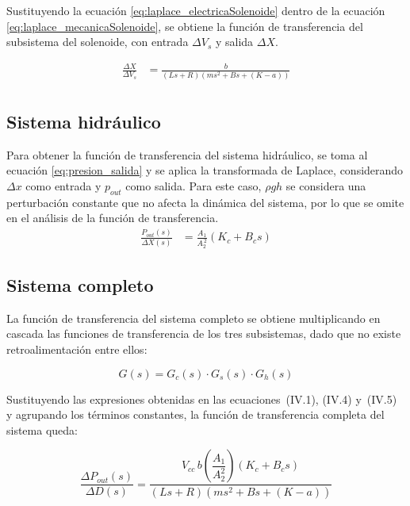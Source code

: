 \documentclass[journal]{IEEEtran}
\begin{document}
Sustituyendo la ecuación \ref{eq:laplace_electricaSolenoide} dentro de la ecuación \ref{eq:laplace_mecanicaSolenoide}, 
se obtiene la función de transferencia del subsistema del solenoide, con entrada $\Delta V_s$ y salida $\Delta X$.

\begin{equation}
\begin{aligned}
    \frac{\Delta X}{\Delta V_s} &= \frac{b}{(Ls + R)(m s^2 + B s + (K - a))} \\
\end{aligned}
\label{eq:funcionTransferencia_solenoide}
\end{equation}

\subsection{Sistema hidráulico}

Para obtener la función de transferencia del sistema hidráulico, se toma al ecuación \ref{eq:presion_salida} y se aplica la transformada de Laplace, considerando $\Delta x$ como entrada y $p_{out}$ como salida. Para este caso, $\rho$$g$$h$ se considera una perturbación constante que no afecta la dinámica del sistema, por lo que se omite en el análisis de la función de transferencia.
\begin{equation}
\begin{aligned}
    \frac{P_{out}(s)}{\Delta X(s)} &= \frac{A_1}{A_2^{\,2}} 
        \left( K_c + B_c s \right)
\end{aligned}
\label{eq:laplace_hidraulico}
\end{equation}


\subsection{Sistema completo}

La función de transferencia del sistema completo se obtiene multiplicando en 
cascada las funciones de transferencia de los tres subsistemas, dado que no 
existe retroalimentación entre ellos:

\begin{equation}
  G(s) = G_c(s)\cdot G_s(s)\cdot G_h(s)
\end{equation}

Sustituyendo las expresiones obtenidas en las ecuaciones~(IV.1), (IV.4) 
y~(IV.5) y agrupando los términos constantes, la función de transferencia completa del 
sistema queda:

\begin{equation}\label{eq:FT_completa}
  \frac{\Delta P_{out}(s)}{\Delta D(s)} = 
  \frac{V_{cc}\, b\!\left(\dfrac{A_1}{A_2^2}\right)(K_c + B_c s)}
       {(Ls + R)\!\left(ms^2 + Bs + (K-a)\right)}
\end{equation}
\end{document}
